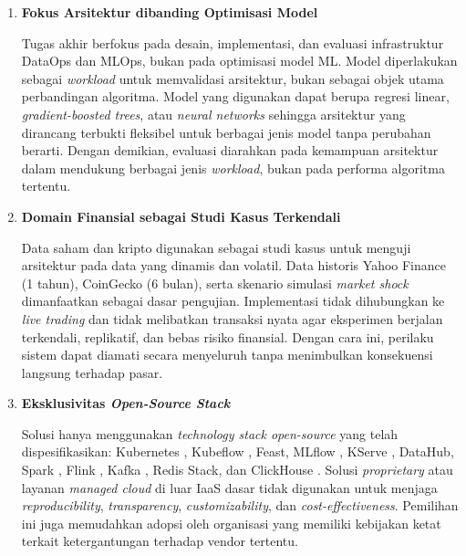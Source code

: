 \vspace{0.5em}
\begin{enumerate}
    \item \textbf{Fokus Arsitektur dibanding Optimisasi Model}
    
    Tugas akhir berfokus pada desain, implementasi, dan evaluasi infrastruktur DataOps dan MLOps, bukan pada optimisasi model ML. Model diperlakukan sebagai \textit{workload} untuk memvalidasi arsitektur, bukan sebagai objek utama perbandingan algoritma. Model yang digunakan dapat berupa regresi linear, \textit{gradient-boosted trees}, atau \textit{neural networks} sehingga arsitektur yang dirancang terbukti fleksibel untuk berbagai jenis model tanpa perubahan berarti. Dengan demikian, evaluasi diarahkan pada kemampuan arsitektur dalam mendukung berbagai jenis \textit{workload}, bukan pada performa algoritma tertentu.
    
    \vspace{0.5em}

    \item \textbf{Domain Finansial sebagai Studi Kasus Terkendali}
    
    Data saham dan kripto digunakan sebagai studi kasus untuk menguji arsitektur pada data yang dinamis dan volatil. Data historis Yahoo Finance (1 tahun), CoinGecko (6 bulan), serta skenario simulasi \textit{market shock} dimanfaatkan sebagai dasar pengujian. Implementasi tidak dihubungkan ke \textit{live trading} dan tidak melibatkan transaksi nyata agar eksperimen berjalan terkendali, replikatif, dan bebas risiko finansial. Dengan cara ini, perilaku sistem dapat diamati secara menyeluruh tanpa menimbulkan konsekuensi langsung terhadap pasar.
    
    \vspace{0.5em}

    \item \textbf{Eksklusivitas \textit{Open-Source Stack}}
    
    Solusi hanya menggunakan \textit{technology stack open-source} yang telah dispesifikasikan: Kubernetes \autocite{lakka2025kubernetes}, Kubeflow \autocite{kubeflow2024}, Feast, MLflow \autocite{mlflow2024}, KServe \autocite{kserve2024}, DataHub, Spark \autocite{apachespark2024}, Flink \autocite{apacheflink2024}, Kafka \autocite{apachekafka2024}, Redis Stack, dan ClickHouse \autocite{clickhouse2024}. Solusi \textit{proprietary} atau layanan \textit{managed cloud} di luar IaaS dasar tidak digunakan untuk menjaga \textit{reproducibility}, \textit{transparency}, \textit{customizability}, dan \textit{cost-effectiveness}. Pemilihan ini juga memudahkan adopsi oleh organisasi yang memiliki kebijakan ketat terkait ketergantungan terhadap vendor tertentu.
    

\end{enumerate}
